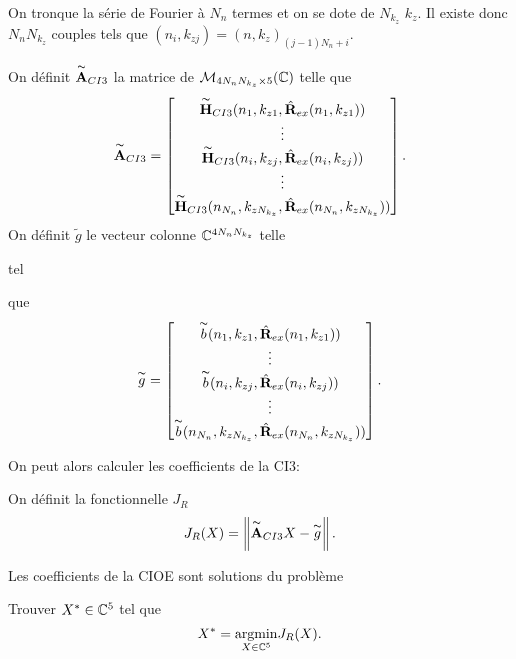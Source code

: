     On tronque la série de Fourier à \(N_{n}\) termes et on se dote de \(N_{k_z}\) \(k_z\). Il existe donc \(N_{n}N_{k_z}\) couples tels que \((n_i,k_{zj}) = (n,k_z)_{(j-1)N_{n}+i}\).
    \begin{defn}
      On définit \(\overset{\thicksim}{\mathbf{A}}_{CI3}\) la matrice de \(\mathcal{M}_{4N_{n}N_{k_z}\times5}(\mathbb C)\) telle que
      \begin{equation*}
        \overset{\thicksim}{\mathbf{A}}_{CI3} = 
        \begin{bmatrix}
          \overset{\thicksim}{\mathbf{H}}_{CI3}(n_1,k_{z1},\hat{\mathbf{R}}_{ex}(n_1,k_{z1}))
          \\
          \vdots
          \\
          \overset{\thicksim}{\mathbf{H}}_{CI3}(n_i,k_{zj},\hat{\mathbf{R}}_{ex}(n_i,k_{zj}))
          \\
          \vdots
          \\
          \overset{\thicksim}{\mathbf{H}}_{CI3}(n_{N_n},k_{zN_{k_z}},\hat{\mathbf{R}}_{ex}(n_{N_n},k_{zN_{k_z}}))
        \end{bmatrix}.
      \end{equation*}
      On définit \(\tilde{g}\) le vecteur colonne \(\mathbb C^{4N_{n}N_{k_z}}\) telle
\begin{REM}
  tel
\end{REM} 
       que
      \begin{equation*}
        \overset{\thicksim}{g} = 
        \begin{bmatrix}
          \overset{\thicksim}{b}(n_1,k_{z1},\hat{\mathbf{R}}_{ex}(n_1,k_{z1}))
          \\
          \vdots
          \\
          \overset{\thicksim}{b}(n_i,k_{zj},\hat{\mathbf{R}}_{ex}(n_i,k_{zj}))
          \\
          \vdots
          \\
          \overset{\thicksim}{b}(n_{N_n},k_{zN_{k_z}},\hat{\mathbf{R}}_{ex}(n_{N_n},k_{zN_{k_z}}))
        \end{bmatrix}.
      \end{equation*}
    \end{defn}

    On peut alors calculer les coefficients de la CI3:

    \begin{defn}
      On définit la fonctionnelle \(J_R\)
      \begin{equation*}
        J_R(X) = \left\lVert\overset{\thicksim}{\mathbf{A}}_{CI3}X - \overset{\thicksim}{g}\right\rVert.
      \end{equation*}
    \end{defn}

    \begin{defn}

      Les coefficients de la CIOE sont solutions du problème

      Trouver \(X^* \in \mathbb C^5\) tel que
      \begin{equation*}
        X^* = {\underset{X\in \mathbb C^5}{\operatorname{argmin}}} J_R(X).
      \end{equation*}
    \end{defn}

